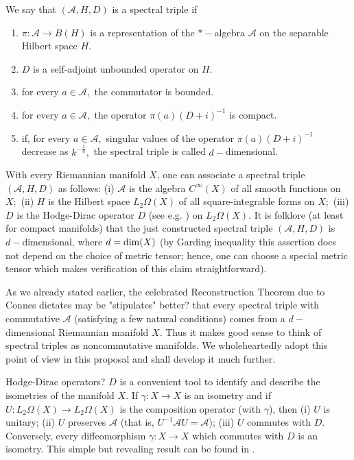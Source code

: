 \documentclass{article}
\begin{document}
We say that $(\mathcal{A},H,D)$ is a spectral triple if
\begin{enumerate}
\item $\pi:\mathcal{A}\to B(H)$ is a representation of the $\ast-$algebra $\mathcal{A}$ on the separable Hilbert space $H.$
\item $D$ is a self-adjoint unbounded operator on $H.$
\item for every $a\in\mathcal{A},$ the commutator is bounded.
\item for every $a\in\mathcal{A},$ the operator $\pi(a)(D+i)^{-1}$ is compact.
\item if, for every $a\in\mathcal{A},$ singular values of the operator $\pi(a)(D+i)^{-1}$ decrease as $k^{-\frac1d},$ the spectral triple is called $d-$dimensional.
\end{enumerate}

With every Riemannian manifold {\color{red} $X$}, one can associate a spectral triple {\color{red} $(\mathcal{A}, H, D)$} as follows: (i) $\mathcal{A}$ is the algebra $C^{\infty}(X)$ of all smooth functions on $X;$ (ii) $H$ is the Hilbert space $L_2\Omega(X)$ of all square-integrable forms on $X;$ (iii) $D$ is the Hodge-Dirac operator $D$ (see e.g. \cite{BGV}) on $L_2\Omega(X).$ It is folklore (at least for compact manifolds) that the just constructed spectral triple $(\mathcal{A},H,D)$ is $d-$dimensional, where $d={\rm dim}(X)$ (by Garding inequality {\color{red} this} assertion does not depend on the choice of metric tensor; hence, one can {\color{red} choose} a special metric tensor which makes verification {\color{red} of this claim} straightforward).

As we already stated earlier, the celebrated Reconstruction Theorem due to Connes \cite{Connes-reconstruction} dictates {\color{red} may be "stipulates" better?}  that every spectral triple with commutative $\mathcal{A}$ (satisfying {\color{red} a} few natural conditions) comes from a $d-$dimensional Riemannian manifold $X.$ Thus it makes good sense to think of spectral triples as noncommutative manifolds. We wholeheartedly adopt this point of view in this proposal and shall develop it much further.


Hodge-Dirac operator{\color{red}s?} $D$ is a convenient tool to identify and describe the isometries of the manifold $X.$ If $\gamma:X\to X$ is an isometry and if $U:L_2\Omega(X)\to L_2\Omega(X)$ is the composition operator (with $\gamma$), then (i) $U$ is unitary; (ii) $U$ preserves $\mathcal{A}$ (that is, $U^{-1}\mathcal{A}U=\mathcal{A}$); (iii) $U$ commutes with $D.$ Conversely, every diffeomorphism $\gamma:X\to X$ which commutes with $D$ is an isometry.
This simple but revealing result can be found in \cite{helgason}.
\end{document}
